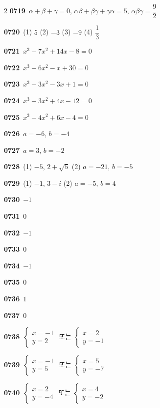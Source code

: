 \documentclass[10pt,a4paper]{article}
\begin{document}
\begin{multicols}{2}
\noindent\textbf{0719}\ $\alpha+\beta+\gamma=0$, $\alpha\beta+\beta\gamma+\gamma\alpha=5$, $\alpha\beta\gamma=\dfrac{9}{2}$\par
\noindent\textbf{0720}\ (1) $5$ (2) $-3$ (3) $-9$ (4) $\dfrac{1}{3}$\par
\noindent\textbf{0721}\ $x^3-7x^2+14x-8=0$\par
\noindent\textbf{0722}\ $x^3-6x^2-x+30=0$\par
\noindent\textbf{0723}\ $x^3-3x^2-3x+1=0$\par
\noindent\textbf{0724}\ $x^3-3x^2+4x-12=0$\par
\noindent\textbf{0725}\ $x^3-4x^2+6x-4=0$\par
\noindent\textbf{0726}\ $a=-6$, $b=-4$\par
\noindent\textbf{0727}\ $a=3$, $b=-2$\par
\noindent\textbf{0728}\ (1) $-5$, $2+\sqrt{5}$ (2) $a=-21$, $b=-5$\par
\noindent\textbf{0729}\ (1) $-1$, $3-i$ (2) $a=-5$, $b=4$\par
\noindent\textbf{0730}\ $-1$\par
\noindent\textbf{0731}\ $0$\par
\noindent\textbf{0732}\ $-1$\par
\noindent\textbf{0733}\ $0$\par
\noindent\textbf{0734}\ $-1$\par
\noindent\textbf{0735}\ $0$\par
\noindent\textbf{0736}\ $1$\par
\noindent\textbf{0737}\ $0$\par
\noindent\textbf{0738}\ $\begin{cases} x=-1 \\ y=2 \end{cases}$ 또는 $\begin{cases} x=2 \\ y=-1 \end{cases}$\par
\noindent\textbf{0739}\ $\begin{cases} x=-1 \\ y=5 \end{cases}$ 또는 $\begin{cases} x=5 \\ y=-7 \end{cases}$\par
\noindent\textbf{0740}\ $\begin{cases} x=2 \\ y=-4 \end{cases}$ 또는 $\begin{cases} x=4 \\ y=-2 \end{cases}$\par

\end{multicols}
\end{document}
